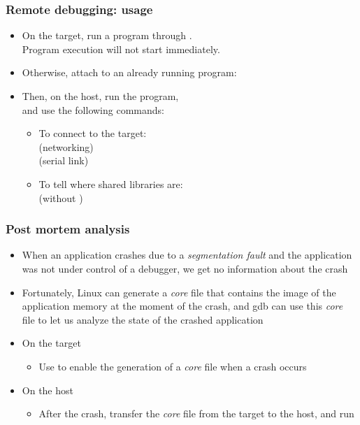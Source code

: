 \begin{frame}
  \frametitle{Remote debugging: usage}
  \begin{itemize}
  \item On the target, run a program through .\\
    Program execution will not start immediately.\\
  \item Otherwise, attach  to an already running program:\\
  \item Then, on the host, run the  program,\\
    and use the following  commands:
    \begin{itemize}
    \item To connect to the target:\\
       (networking)\\
       (serial link)
    \item To tell  where shared libraries are:\\
       (without )
    \end{itemize}
  \end{itemize}
\end{frame}

\begin{frame}
  \frametitle{Post mortem analysis}
  \begin{itemize}
  \item When an application crashes due to a {\em segmentation fault}
    and the application was not under control of a debugger, we get no
    information about the crash
  \item Fortunately, Linux can generate a {\em core} file that
    contains the image of the application memory at the moment of the
    crash, and gdb can use this {\em core} file to let us analyze the
    state of the crashed application
  \item On the target
    \begin{itemize}
    \item Use  to enable the generation of a
      {\em core} file when a crash occurs
    \end{itemize}
  \item On the host
    \begin{itemize}
    \item After the crash, transfer the {\em core} file from the target to
      the host, and run
    \end{itemize}
  \end{itemize}
\end{frame}

